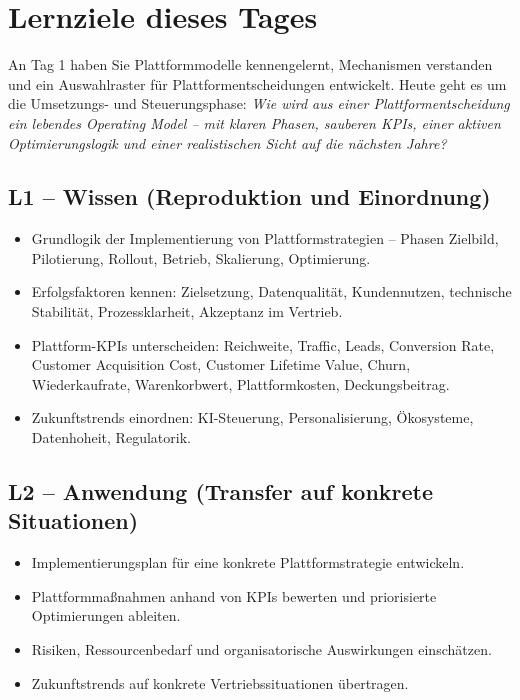 \documentclass[11pt,a4paper,oneside]{article}
\begin{document}
\section*{Lernziele dieses Tages}
\thispagestyle{plain}

\noindent An Tag 1 haben Sie Plattformmodelle kennengelernt, Mechanismen verstanden und ein Auswahlraster für Plattform­entscheidungen entwickelt. Heute geht es um die Umsetzungs- und Steuerungsphase: \emph{Wie wird aus einer Plattform­entscheidung ein lebendes Operating Model -- mit klaren Phasen, sauberen KPIs, einer aktiven Optimierungslogik und einer realistischen Sicht auf die nächsten Jahre?}

\subsection*{L1 -- Wissen (Reproduktion und Einordnung)}
\begin{itemize}
  \item Grundlogik der Implementierung von Plattformstrategien -- Phasen Zielbild, Pilotierung, Rollout, Betrieb, Skalierung, Optimierung.
  \item Erfolgsfaktoren kennen: Zielsetzung, Datenqualität, Kundennutzen, technische Stabilität, Prozessklarheit, Akzeptanz im Vertrieb.
  \item Plattform-KPIs unterscheiden: Reichweite, Traffic, Leads, Conversion Rate, Customer Acquisition Cost, Customer Lifetime Value, Churn, Wiederkaufrate, Warenkorbwert, Plattformkosten, Deckungsbeitrag.
  \item Zukunftstrends einordnen: KI-Steuerung, Personalisierung, Ökosysteme, Datenhoheit, Regulatorik.
\end{itemize}

\subsection*{L2 -- Anwendung (Transfer auf konkrete Situationen)}
\begin{itemize}
  \item Implementierungsplan für eine konkrete Plattformstrategie entwickeln.
  \item Plattformmaßnahmen anhand von KPIs bewerten und priorisierte Optimierungen ableiten.
  \item Risiken, Ressourcenbedarf und organisatorische Auswirkungen einschätzen.
  \item Zukunftstrends auf konkrete Vertriebssituationen übertragen.
\end{itemize}
\end{document}
